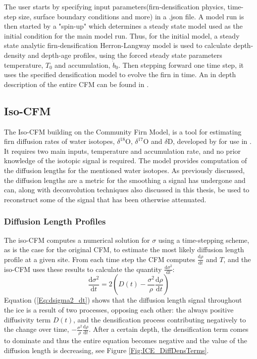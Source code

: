 \documentclass[../../CompleteThesis2/Complete_2ndDraft]{subfiles}
\begin{document}
The user starts by specifying input parameters(firn-densification physics, time-step size, surface boundary conditions and more) in a .json file. A model run is then started by a "spin-up" which determines a steady state model used as the initial condition for the main model run. Thus, for the initial model, a steady state analytic firn-densification Herron-Langway model \cite[Herron and Langway, 1980]{HerronLangway1980} is used to calculate depth-density and depth-age profiles, using the forced steady state parameters temperature, $T_0$ and accumulation, $\dot{b}_0$. Then stepping forward one time step, it uses the specified densification model to evolve the firn in time. An in depth description of the entire CFM can be found in \cite[Stevens et al.]{Stevens2020}.

\subsection[Iso-CFM]{Iso-CFM}
\label{Subsec:Ice_DiffusionAndDensification_IsoCFM}

The Iso-CFM building on the Community Firn Model, is a tool for estimating firn diffusion rates of water isotopes, $\delta^{18}$O, $\delta^{17}$O and $\delta$D, developed by \cite[Gkinis et al., 2021]{Gkinis2021} for use in \cite{Gkinis2021}. It requires two main inputs, temperature and accumulation rate, and no prior knowledge of the isotopic signal is required. The model provides computation of the diffusion lengths for the mentioned water isotopes. As previously discussed, the diffusion lengths are a metric for the smoothing a signal has undergone and can, along with deconvolution techniques also discussed in this thesis, be used to reconstruct some of the signal that has been otherwise attenuated.


\subsubsection[Diffusion Length Profiles]{Diffusion Length Profiles}
\label{Subsubsec:Ice_DiffusionAndDensification_IsoCFM_DiffLenProfile}

The iso-CFM computes a numerical solution for $\sigma$ using a time-stepping scheme, as is the case for the original CFM, to estimate the most likely diffusion length profile at a given site. From each time step the CFM computes $\frac{\text{d}\rho}{\text{d}t}$ and $T$, and the iso-CFM uses these results to calculate the quantity $\frac{\text{d}\sigma^2}{\text{d}t}$:
\begin{equation}
	\frac{\text{d}\sigma^2}{\text{d}t} = 2\left(D(t) - \frac{\sigma^2}{\rho}\frac{\text{d}\rho}{\text{d}t}\right)
	\label{Eq:dsigma2_dt}
\end{equation}
Equation (\ref{Eq:dsigma2_dt}) shows that the diffusion length signal throughout the ice is a result of two processes, opposing each other: the always positive diffusivity term $D(t)$, and the densification process contributing negatively to the change over time, $-\frac{\sigma^2}{\rho}\frac{\text{d}\rho}{\text{d}t}$. After a certain depth, the densification term comes to dominate and thus the entire equation becomes negative and the value of the diffusion length is decreasing, see Figure \ref{Fig:ICE_DiffDensTerms}.
\end{document}
